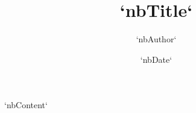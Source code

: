 \documentclass{article}
\begin{document}
% 

\title{`nbTitle`}
\author{`nbAuthor`}
\date{`nbDate`}
\maketitle

`nbContent`
\end{document}
